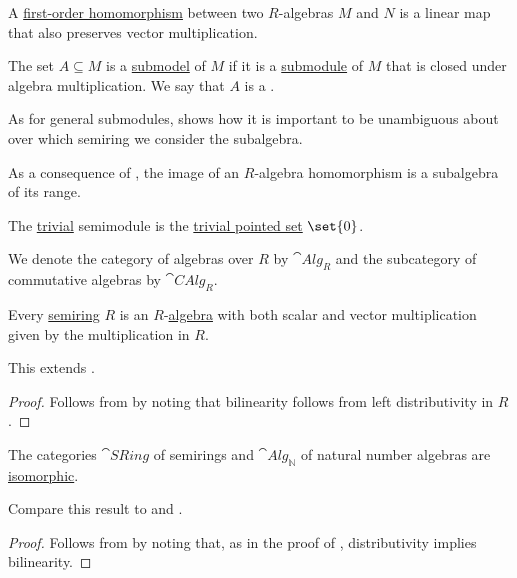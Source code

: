 \begin{definition}
\begin{thmenum}
     A \hyperref[def:first_order_homomorphism]{first-order homomorphism} between two \( R \)-algebras \( M \) and \( N \) is a linear map that also preserves vector multiplication.

     The set \( A \subseteq M \) is a \hyperref[thm:substructure_is_model]{submodel} of \( M \) if it is a \hyperref[def:monoid/submodel]{submodule} of \( M \) that is closed under algebra multiplication. We say that \( A \) is a .

    As for general submodules,  shows how it is important to be unambiguous about over which semiring we consider the subalgebra.

    As a consequence of , the image of an \( R \)-algebra homomorphism is a subalgebra of its range.

     The \hyperref[thm:substructures_form_complete_lattice/bottom]{trivial} semimodule is the \hyperref[def:pointed_set/trivial]{trivial pointed set} \( \set{ 0 } \).

     We denote the category of algebras over \( R \) by \( \cat{Alg}_R \) and the subcategory of commutative algebras by \( \cat{CAlg}_R \).
  \end{thmenum}
\end{definition}

\begin{proposition}\label{thm:semiring_is_algebra}
  Every \hyperref[def:semiring]{semiring} \( R \) is an \( R \)-\hyperref[def:algebra_over_semiring]{algebra} with both scalar and vector multiplication given by the multiplication in \( R \).

  This extends .
\end{proposition}
\begin{proof}
  Follows from  by noting that bilinearity follows from left distributivity in \( R \).
\end{proof}

\begin{proposition}\label{thm:semiring_is_natural_number_algebra}
  The categories \( \hyperref[def:semiring/category]{\cat{SRing}} \) of semirings and \( \hyperref[def:algebra_over_semiring/category]{\cat{Alg}_\BbbN} \) of natural number algebras are \hyperref[rem:category_similarity/isomorphism]{isomorphic}.

  Compare this result to  and .
\end{proposition}
\begin{proof}
  Follows from  by noting that, as in the proof of , distributivity implies bilinearity.
\end{proof}

